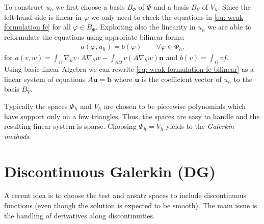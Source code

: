 To construct $u_h$ we first choose a basis $B_{\Phi}$ of $\Phi$ and a basis $B_V$ of $V_h$.
Since the left-hand side is linear in $\varphi$ we only need to check the equations in \eqref{eq: weak formulation fe} for all $\varphi \in B_{\Phi}$. Exploiting also the linearity in $u_h$  we are able to reformulate the equations using approriate bilinear forms:
\begin{align}
	a(\varphi,u_h)  =b(\varphi) \qquad \forall \varphi \in \Phi_h. \label{eq: weak formulation fe bilinear}
\end{align}
for $a(v,w)= \int_\Omega \nabla_h v  \cdot A\nabla_h w -\int_{\partial \Omega} v (A\nabla_h w)\mathbf{n}$ and $b(v) = \int_\Omega v f$.\\
Using basic linear Algebra we can rewrite \eqref{eq: weak formulation fe bilinear} as a linear system of equations $A \mathbf{u} = \mathbf{b}$ where  $\mathbf{u}$ is the coefficient vector of $u_h$ to the basis $B_V$.  

Typically the spaces $\Phi_h$ and $V_h$ are chosen to be piecewise polynomials which have support only on a few triangles. Thus, the spaces are easy to handle and the resulting linear system is sparse.
Choosing $\Phi_h = V_h$ yields to the \emph{Galerkin methods}.

\section{Discontinuous Galerkin (DG)} \label{sec: SIPG}
A recent idea is to choose the test and ansatz spaces to include discontinuous functions (even though the solution is expected to be smooth).
The main issue is the handling of derivatives along discontinuities.

